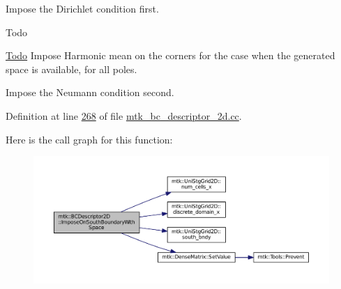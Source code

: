 \begin{DoxyEnumerate}
\item Impose the Dirichlet condition first.
\end{DoxyEnumerate}

\begin{DoxyRefDesc}{Todo}
\item[\hyperlink{todo__todo000013}{Todo}]Impose Harmonic mean on the corners for the case when the generated space is available, for all poles. \end{DoxyRefDesc}



\begin{DoxyEnumerate}
\item Impose the Neumann condition second. 
\end{DoxyEnumerate}

Definition at line \hyperlink{mtk__bc__descriptor__2d_8cc_source_l00268}{268} of file \hyperlink{mtk__bc__descriptor__2d_8cc_source}{mtk\+\_\+bc\+\_\+descriptor\+\_\+2d.\+cc}.



Here is the call graph for this function\+:\nopagebreak
\begin{figure}[H]
\begin{center}
\leavevmode
\includegraphics[width=350pt]{classmtk_1_1BCDescriptor2D_af30c275cf06176a2ae9722014142c810_cgraph}
\end{center}
\end{figure}


